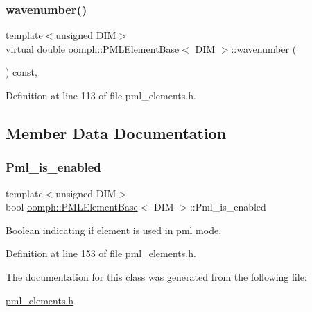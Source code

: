 \subsubsection{\texorpdfstring{wavenumber()}{wavenumber()}}
{\footnotesize\ttfamily template$<$unsigned D\+IM$>$ \\
virtual double \hyperlink{classoomph_1_1PMLElementBase}{oomph\+::\+P\+M\+L\+Element\+Base}$<$ D\+IM $>$\+::wavenumber (\begin{DoxyParamCaption}{ }\end{DoxyParamCaption}) const\hspace{0.3cm}{\ttfamily [inline]}, {\ttfamily [virtual]}}



Definition at line 113 of file pml\+\_\+elements.\+h.



\subsection{Member Data Documentation}
\mbox{\label{classoomph_1_1PMLElementBase_a0b0e980998764978801a1f0463a31989}} 
\subsubsection{\texorpdfstring{Pml\+\_\+is\+\_\+enabled}{Pml\_is\_enabled}}
{\footnotesize\ttfamily template$<$unsigned D\+IM$>$ \\
bool \hyperlink{classoomph_1_1PMLElementBase}{oomph\+::\+P\+M\+L\+Element\+Base}$<$ D\+IM $>$\+::Pml\+\_\+is\+\_\+enabled\hspace{0.3cm}{\ttfamily [protected]}}



Boolean indicating if element is used in pml mode. 



Definition at line 153 of file pml\+\_\+elements.\+h.



The documentation for this class was generated from the following file\+:\begin{DoxyCompactItemize}
\item 
\hyperlink{pml__elements_8h}{pml\+\_\+elements.\+h}\end{DoxyCompactItemize}
